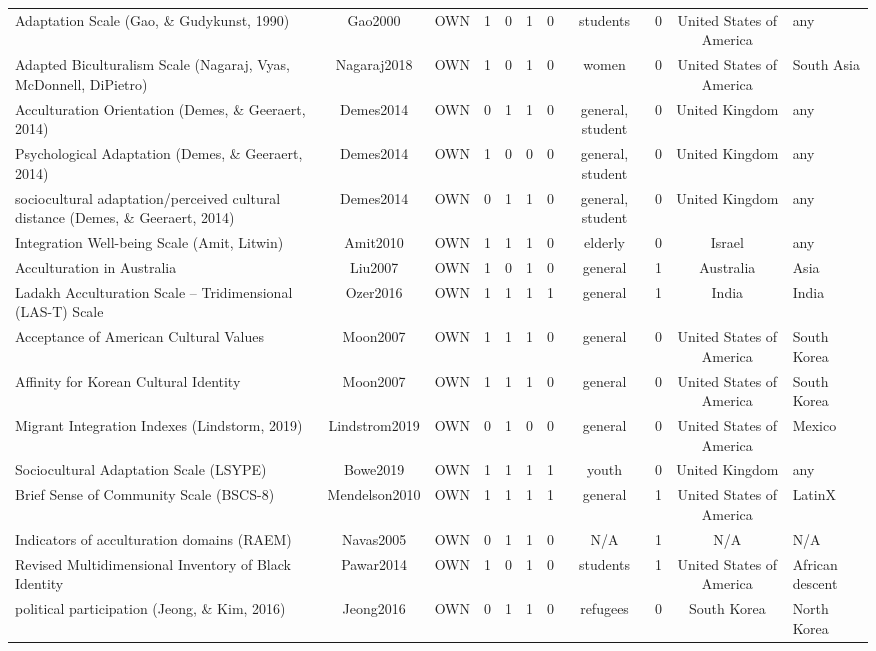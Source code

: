 \begin{longtable}[l]{lclclclclcl}
Adaptation Scale (Gao, \& Gudykunst, 1990) & Gao2000 & OWN & 1 & 0 & 1 & 0 & students & 0 & United States of America & any\\
Adapted Biculturalism Scale (Nagaraj, Vyas, McDonnell, DiPietro) & Nagaraj2018 & OWN & 1 & 0 & 1 & 0 & women & 0 & United States of America & South Asia\\
Acculturation Orientation (Demes, \& Geeraert, 2014) & Demes2014 & OWN & 0 & 1 & 1 & 0 & general, student & 0 & United Kingdom & any\\
Psychological Adaptation (Demes, \& Geeraert, 2014) & Demes2014 & OWN & 1 & 0 & 0 & 0 & general, student & 0 & United Kingdom & any\\
sociocultural adaptation/perceived cultural distance (Demes, \& Geeraert, 2014) & Demes2014 & OWN & 0 & 1 & 1 & 0 & general, student & 0 & United Kingdom & any\\
Integration Well-being Scale (Amit, Litwin) & Amit2010 & OWN & 1 & 1 & 1 & 0 & elderly & 0 & Israel & any\\
Acculturation in Australia & Liu2007 & OWN & 1 & 0 & 1 & 0 & general & 1 & Australia & Asia\\
Ladakh Acculturation Scale – Tridimensional (LAS-T) Scale & Ozer2016 & OWN & 1 & 1 & 1 & 1 & general & 1 & India & India\\
Acceptance of American Cultural Values & Moon2007 & OWN & 1 & 1 & 1 & 0 & general & 0 & United States of America & South Korea\\
Affinity for Korean Cultural Identity & Moon2007 & OWN & 1 & 1 & 1 & 0 & general & 0 & United States of America & South Korea\\
Migrant Integration Indexes (Lindstorm, 2019) & Lindstrom2019 & OWN & 0 & 1 & 0 & 0 & general & 0 & United States of America & Mexico\\
Sociocultural Adaptation Scale (LSYPE) & Bowe2019 & OWN & 1 & 1 & 1 & 1 & youth & 0 & United Kingdom & any\\
Brief Sense of Community Scale (BSCS-8) & Mendelson2010 & OWN & 1 & 1 & 1 & 1 & general & 1 & United States of America & LatinX\\
Indicators of acculturation domains (RAEM) & Navas2005 & OWN & 0 & 1 & 1 & 0 & N/A & 1 & N/A & N/A\\
Revised Multidimensional Inventory of Black Identity & Pawar2014 & OWN & 1 & 0 & 1 & 0 & students & 1 & United States of America & African descent\\
political participation (Jeong, \& Kim, 2016) & Jeong2016 & OWN & 0 & 1 & 1 & 0 & refugees & 0 & South Korea & North Korea\\

\end{longtable}
